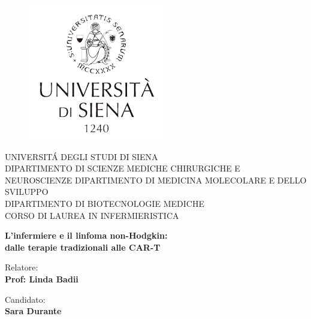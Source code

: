 \begin{titlepage}
\begin{figure}[!htb]
    \centering
    \includegraphics[keepaspectratio=true,scale=0.8]{format/img/unisi.png}
\end{figure}

\begin{center}
    \LARGE{UNIVERSIT\'A DEGLI STUDI DI SIENA}
    \vspace{5mm}
    \\ \large{DIPARTIMENTO DI SCIENZE MEDICHE CHIRURGICHE E NEUROSCIENZE
    DIPARTIMENTO DI MEDICINA MOLECOLARE E DELLO SVILUPPO\\
    DIPARTIMENTO DI BIOTECNOLOGIE MEDICHE}
    \vspace{5mm}
    \\ \LARGE{CORSO DI LAUREA IN INFERMIERISTICA}
\end{center}

\vspace{15mm}
\begin{center}
    {\LARGE{\bf L'infermiere e il linfoma non-Hodgkin:\\ \vspace{5mm} dalle terapie tradizionali alle CAR-T }}
    
    
\end{center}
\vspace{30mm}

\begin{minipage}[t]{0.47\textwidth}
	{\large{Relatore:}{\normalsize\vspace{3mm}
	\bf\\ \large{Prof: Linda Badii} \normalsize\vspace{3mm}\bf \\}}
\end{minipage}
\hfill
\begin{minipage}[t]{0.47\textwidth}\raggedleft
	{\large{Candidato:}{\normalsize\vspace{3mm} \bf\\ \large{Sara Durante}}}
\end{minipage}

\vspace{30mm}

\end{titlepage}